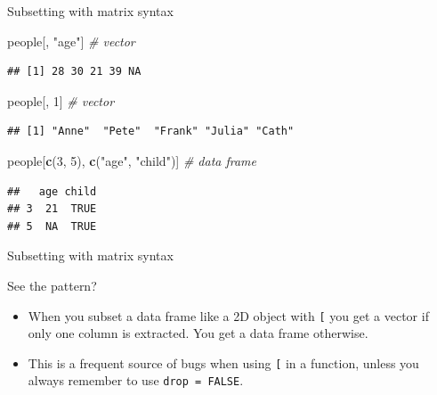 \documentclass[ignorenonframetext,]{beamer}
\newenvironment{Shaded}{\begin{snugshade}}{\end{snugshade}}
\newcommand{\CommentTok}[1]{\textcolor[rgb]{0.56,0.35,0.01}{\textit{#1}}}
\newcommand{\DecValTok}[1]{\textcolor[rgb]{0.00,0.00,0.81}{#1}}
\newcommand{\KeywordTok}[1]{\textcolor[rgb]{0.13,0.29,0.53}{\textbf{#1}}}
\newcommand{\NormalTok}[1]{#1}
\newcommand{\StringTok}[1]{\textcolor[rgb]{0.31,0.60,0.02}{#1}}
\begin{document}
\begin{frame}[fragile]{Subsetting with matrix syntax}
\protect\hypertarget{subsetting-with-matrix-syntax-1}{}

\begin{Shaded}
\begin{Highlighting}[]
\NormalTok{people[, }\StringTok{"age"}\NormalTok{] }\CommentTok{# vector}
\end{Highlighting}
\end{Shaded}

\begin{verbatim}
## [1] 28 30 21 39 NA
\end{verbatim}

\begin{Shaded}
\begin{Highlighting}[]
\NormalTok{people[, }\DecValTok{1}\NormalTok{] }\CommentTok{#  vector}
\end{Highlighting}
\end{Shaded}

\begin{verbatim}
## [1] "Anne"  "Pete"  "Frank" "Julia" "Cath"
\end{verbatim}

\begin{Shaded}
\begin{Highlighting}[]
\NormalTok{people[}\KeywordTok{c}\NormalTok{(}\DecValTok{3}\NormalTok{, }\DecValTok{5}\NormalTok{), }\KeywordTok{c}\NormalTok{(}\StringTok{"age"}\NormalTok{, }\StringTok{"child"}\NormalTok{)] }\CommentTok{# data frame}
\end{Highlighting}
\end{Shaded}

\begin{verbatim}
##   age child
## 3  21  TRUE
## 5  NA  TRUE
\end{verbatim}

\end{frame}

\begin{frame}[fragile]{Subsetting with matrix syntax}
\protect\hypertarget{subsetting-with-matrix-syntax-2}{}

See the pattern?

\begin{itemize}
\item
  When you subset a data frame like a 2D object with \texttt{{[}} you
  get a vector if only one column is extracted. You get a data frame
  otherwise.
\item
  This is a frequent source of bugs when using \texttt{{[}} in a
  function, unless you always remember to use \texttt{drop\ =\ FALSE}.
\end{itemize}

\end{frame}
\end{document}
